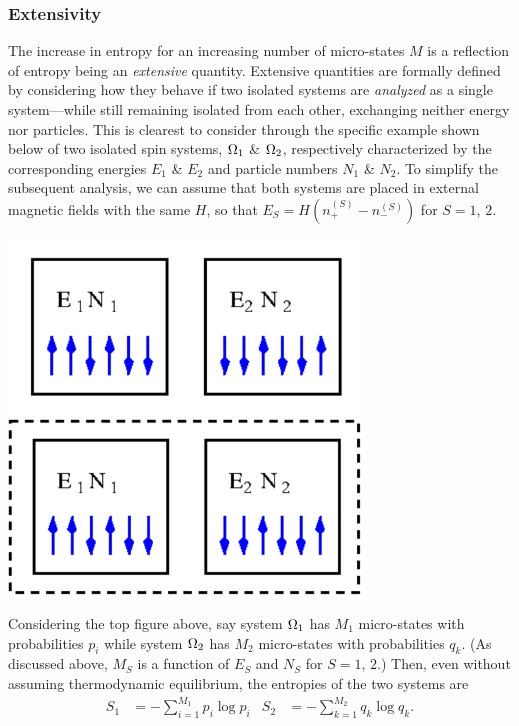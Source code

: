 \subsubsection{Extensivity}
The increase in entropy for an increasing number of micro-states $M$ is a reflection of entropy being an \textit{extensive} quantity. %
Extensive quantities are formally defined by considering how they behave if two isolated systems are \textit{analyzed} as a single system---while still remaining isolated from each other, exchanging neither energy nor particles.
This is clearest to consider through the specific example shown below of two isolated spin systems, $\Omega_1$ \& $\Omega_2$, respectively characterized by the corresponding energies $E_1$ \& $E_2$ and particle numbers $N_1$ \& $N_2$.
To simplify the subsequent analysis, we can assume that both systems are placed in external magnetic fields with the same $H$, so that $E_S = H\left(n_+^{(S)} - n_-^{(S)}\right)$ for $S = 1$, $2$.
\begin{center}
  \includegraphics[width=0.7\textwidth]{figs/week02_entropy-separate.pdf} \\
  \includegraphics[width=0.7\textwidth]{figs/week02_entropy-combo.pdf}
\end{center}

Considering the top figure above, say system $\Omega_1$ has $M_1$ micro-states with probabilities $p_i$ while system $\Omega_2$ has $M_2$ micro-states with probabilities $q_k$.
(As discussed above, $M_S$ is a function of $E_S$ and $N_S$ for $S = 1$, $2$.)
Then, even without assuming thermodynamic equilibrium, the entropies of the two systems are
\begin{align*}
  S_1 & = - \sum_{i = 1}^{M_1} p_i \log p_i &
  S_2 & = - \sum_{k = 1}^{M_2} q_k \log q_k.
\end{align*}

